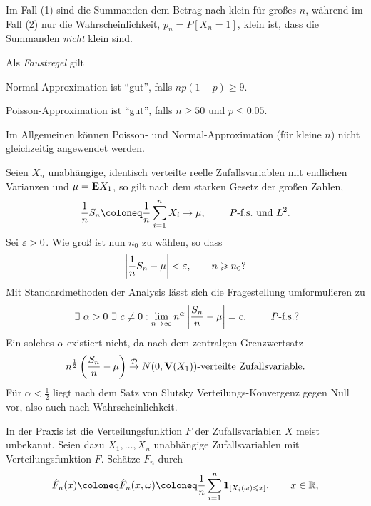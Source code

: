 Im Fall (1) sind die Summanden dem Betrag nach klein für großes $n$, während
im Fall (2) nur die Wahrscheinlichkeit, $p_n=P[X_n=1]$, klein ist,
dass die Summanden \textit{nicht} klein sind.

Als \textit{Faustregel} gilt
\begin{defnpropenum}
  \item Normal-Approximation ist ``gut'', falls $np(1-p)\ge 9$.
  \item Poisson-Approximation ist ``gut'', falls $n\ge 50$ und $p\le 0.05$.
\end{defnpropenum}
Im Allgemeinen können Poisson- und Normal-Approximation (für kleine $n$) nicht
gleichzeitig angewendet werden.


\begin{bem}[Bemerkungen.]
\label{bem:9.3}
\begin{bemenum}
\item Seien $X_n$ unabhängige, identisch verteilte reelle Zufallsvariablen mit
endlichen Varianzen und $\mu=\textbf{E} X_1$, so gilt nach dem starken Gesetz der großen
Zahlen,
\begin{align*}
\frac{1}{n}S_n \defl \frac{1}{n}\sum_{i=1}^n X_i\to \mu,\qquad
\Pfs\text{ und }L^2. 
\end{align*}
Sei $\varepsilon > 0$. Wie groß ist nun $n_0$ zu wählen, so dass
\begin{align*}
\left|\frac{1}{n}S_n - \mu\right| < \varepsilon,\qquad n\geqslant n_0?
\end{align*}
Mit Standardmethoden der Analysis lässt sich die Fragestellung umformulieren zu
\begin{align*}
\exists \alpha > 0 \exists c\neq 0 :
\lim\limits_{n\to\infty} n^\alpha \abs{\frac{S_n}{n}-\mu} = c,\qquad
\Pfs?
\end{align*}
Ein solches $\alpha$ existiert nicht, da nach dem zentralgen Grenzwertsatz
\begin{align*}
n^{\frac{1}{2}} \left(
\frac{S_n}{n}-\mu
\right)
\overset{\mathcal{D}}{\to}
N(0,\textbf{V}(X_1))\text{-verteilte Zufallsvariable}.
\end{align*}
Für $\alpha<\frac{1}{2}$ liegt nach dem Satz von Slutsky Verteilungs-Konvergenz
gegen Null vor, also auch nach Wahrscheinlichkeit.
\item In der Praxis ist die Verteilungsfunktion $F$ der Zufallsvariablen
$X$ meist unbekannt. Seien dazu $X_1,\ldots,X_n$ unabhängige
Zufallsvariablen mit Verteilungsfunktion $F$. Schätze $F_n$ durch
\begin{align*}
\hat{F}_n(x) \defl \hat{F}_n(x,\omega) \defl
\frac{1}{n}\sum_{i=1}^n \Id_{[X_i(\omega)\le x]},\qquad x\in\R,

\end{align*}
\end{bemenum}
\end{bem}
